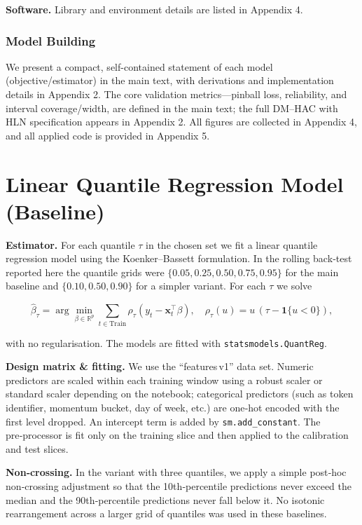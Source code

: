 \documentclass[
  a4paper,
  DIV=11,
  numbers=noendperiod]{scrreprt}
\begin{document}
\textbf{Software.} Library and environment details are listed in
Appendix 4.

\subsubsection{Model Building}\label{model-building}

We present a compact, self-contained statement of each model
(objective/estimator) in the main text, with derivations and
implementation details in Appendix 2. The core validation
metrics---pinball loss, reliability, and interval coverage/width, are
defined in the main text; the full DM--HAC with HLN specification
appears in Appendix 2. All figures are collected in Appendix 4, and all
applied code is provided in Appendix 5.

\section{Linear Quantile Regression Model
(Baseline)}\label{linear-quantile-regression-model-baseline}

\textbf{Estimator.} For each quantile \(\tau\) in the chosen set we fit
a linear quantile regression model using the Koenker--Bassett
formulation. In the rolling back‑test reported here the quantile grids
were \(\{0.05,0.25,0.50,0.75,0.95\}\) for the main baseline and
\(\{0.10,0.50,0.90\}\) for a simpler variant. For each \(\tau\) we solve

\[
\widehat\beta_\tau = \arg\min_{\beta\in\mathbb{R}^p} \sum_{t\in\text{Train}} \rho_\tau(y_t - \mathbf{x}_t^{\top}\beta), \quad \rho_\tau(u) = u\,(\tau-\mathbf{1}\{u<0\}),
\]

with no regularisation. The models are fitted with
\texttt{statsmodels.QuantReg}.

\textbf{Design matrix \& fitting.} We use the ``features\,v1'' data set.
Numeric predictors are scaled within each training window using a robust
scaler or standard scaler depending on the notebook; categorical
predictors (such as token identifier, momentum bucket, day of week,
etc.) are one‑hot encoded with the first level dropped. An intercept
term is added by \texttt{sm.add\_constant}. The pre‑processor is fit
only on the training slice and then applied to the calibration and test
slices.

\textbf{Non‑crossing.} In the variant with three quantiles, we apply a
simple post‑hoc non‑crossing adjustment so that the 10th‑percentile
predictions never exceed the median and the 90th‑percentile predictions
never fall below it. No isotonic rearrangement across a larger grid of
quantiles was used in these baselines.
\end{document}
